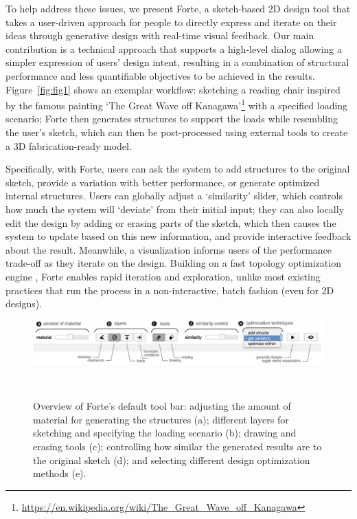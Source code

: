 
To help address these issues, we present Forte, a sketch-based 2D design tool that takes a user-driven approach for people to directly express and iterate on their ideas through generative design with real-time visual feedback.
Our main contribution is a technical approach that supports a high-level dialog allowing a simpler expression of users' design intent, resulting in a combination of structural performance and less quantifiable objectives to be achieved in the results. Figure~\ref{fig:fig1} shows an exemplar workflow: sketching a reading chair inspired by the famous painting `The Great Wave off Kanagawa'\footnote{\url{https://en.wikipedia.org/wiki/The_Great_Wave_off_Kanagawa}} with a specified loading scenario; Forte then generates structures to support the loads while resembling the user's sketch, which can then be post-processed using external tools to create a 3D fabrication-ready model.

Specifically, with Forte, users can ask the system to add structures to the original sketch, provide a variation with better performance, or generate optimized internal structures.
Users can globally adjust a `similarity' slider, which controls how much the system will `deviate' from their initial input; they can also locally edit the design by adding or erasing parts of the sketch, which then causes the system to update based on this new information, and provide interactive feedback about the result.
Meanwhile, a visualization informs users of the performance trade-off as they iterate on the design.
Building on a fast topology optimization engine \cite{andreassen2011efficient}, Forte enables rapid iteration and exploration, unlike most existing practices that run the process in a non-interactive, batch fashion (even for 2D designs).

\begin{figure} [t]
  \centering
  \includegraphics[width=1\textwidth]{figures/overview}
  \caption{Overview of Forte's default tool bar: adjusting the amount of material for generating the structures (a); different layers for sketching and specifying the loading scenario (b); drawing and erasing tools (c); controlling how similar the generated results are to the original sketch (d); and selecting different design optimization methods (e).}~\label{fig:overview}
\end{figure}

